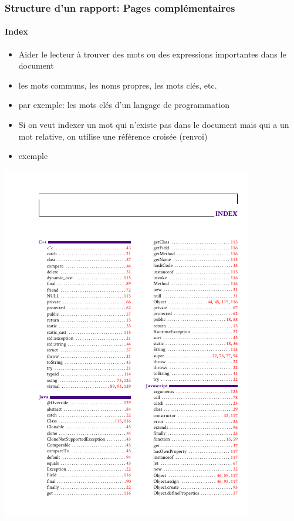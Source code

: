 \documentclass[xcolor=table]{beamer}
\begin{document}
\begin{frame}
\frametitle{Structure d'un rapport: Pages complémentaires}
\framesubtitle{Index}

\begin{minipage}{0.52\textwidth}
	\begin{itemize}
		\item Aider le lecteur à trouver des mots ou des expressions importantes dans le document
		\item les mots communs, les noms propres, les mots clés, etc. 
		\item par exemple: les mots clés d'un langage de programmation 
		\item Si on veut indexer un mot qui n'existe pas dans le document mais qui a un mot relative, on utilise une référence croisée (renvoi) 
		\item exemple 
	\end{itemize}
\end{minipage}
\begin{minipage}{0.42\textwidth}
	\includegraphics[width=\textwidth]{..//img/Bweb03-redaction/index.png}
\end{minipage}

\end{frame}
\end{document}
